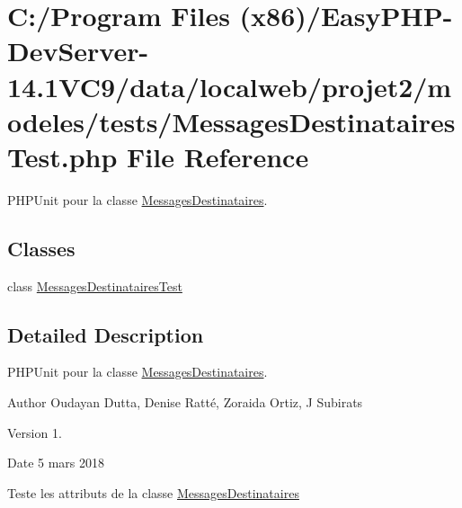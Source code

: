 \hypertarget{_messages_destinataires_test_8php}{}\section{C\+:/\+Program Files (x86)/\+Easy\+P\+H\+P-\/\+Dev\+Server-\/14.1\+V\+C9/data/localweb/projet2/modeles/tests/\+Messages\+Destinataires\+Test.php File Reference}
\label{_messages_destinataires_test_8php}


P\+H\+P\+Unit pour la classe \hyperlink{class_messages_destinataires}{Messages\+Destinataires}.  


\subsection*{Classes}
\begin{DoxyCompactItemize}
\item 
class \hyperlink{class_messages_destinataires_test}{Messages\+Destinataires\+Test}
\end{DoxyCompactItemize}


\subsection{Detailed Description}
P\+H\+P\+Unit pour la classe \hyperlink{class_messages_destinataires}{Messages\+Destinataires}. 

\begin{DoxyAuthor}{Author}
Oudayan Dutta, Denise Ratté, Zoraida Ortiz, J Subirats 
\end{DoxyAuthor}
\begin{DoxyVersion}{Version}
1. 
\end{DoxyVersion}
\begin{DoxyDate}{Date}
5 mars 2018
\end{DoxyDate}
Teste les attributs de la classe \hyperlink{class_messages_destinataires}{Messages\+Destinataires} 